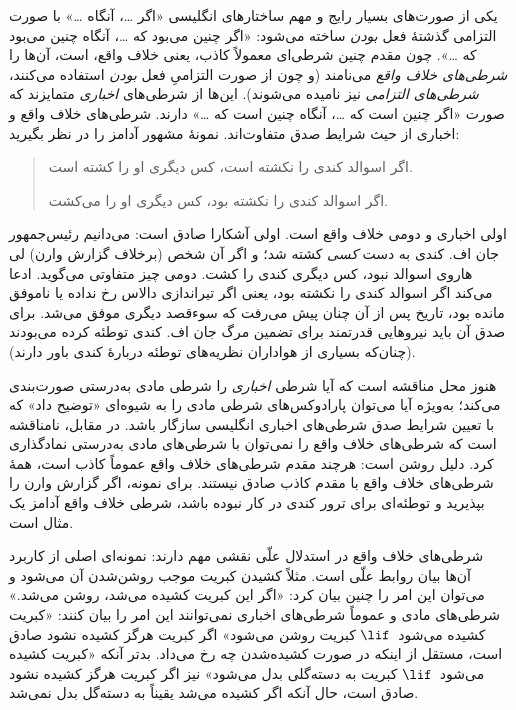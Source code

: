 \documentclass[../../../include/open-logic-section]{subfiles}
\begin{document}


یکی از صورت‌های بسیار رایج و مهم ساختارهای انگلیسی «اگر \dots، آنگاه
\dots» با صورت التزامی گذشتهٔ فعل \emph{بودن} ساخته می‌شود: «اگر چنین
می‌بود که \dots، آنگاه چنین می‌بود که \dots». چون مقدم چنین شرطی‌ای
معمولاً کاذب، یعنی خلاف واقع، است، آن‌ها را \emph{شرطی‌های خلاف واقع}
می‌نامند (و چون از صورت التزامیِ فعل \emph{بودن} استفاده می‌کنند،
\emph{شرطی‌های التزامی} نیز نامیده می‌شوند). این‌ها از شرطی‌های
\emph{اخباری} متمایزند که صورت «اگر چنین است که \dots، آنگاه چنین است
که \dots» دارند. شرطی‌های خلاف واقع و اخباری از حیث شرایط صدق متفاوت‌اند.
نمونهٔ مشهور آدامز را در نظر بگیرید:
\begin{quote}
  اگر اسوالد کندی را نکشته است، کس دیگری او را کشته است.
  
  اگر اسوالد کندی را نکشته بود، کس دیگری او را می‌کشت.
\end{quote}
اولی اخباری و دومی خلاف واقع است. اولی آشکارا صادق است: می‌دانیم
رئیس‌جمهور جان اف. کندی به دست \emph{کسی} کشته شد؛ و اگر آن شخص
(برخلاف گزارش وارن) لی هاروی اسوالد نبود، کس دیگری کندی را کشت. دومی
چیز متفاوتی می‌گوید. ادعا می‌کند اگر اسوالد کندی را نکشته بود، یعنی اگر
تیراندازی دالاس رخ نداده یا ناموفق مانده بود، تاریخ پس از آن چنان پیش
می‌رفت که سوءقصد دیگری موفق می‌شد. برای صدق آن باید نیروهایی قدرتمند
برای تضمین مرگ جان اف. کندی توطئه کرده می‌بودند (چنان‌که بسیاری از
هواداران نظریه‌های توطئه دربارهٔ کندی باور دارند).

هنوز محل مناقشه است که آیا شرطی \emph{اخباری} را شرطی مادی به‌درستی
صورت‌بندی می‌کند؛ به‌ویژه آیا می‌توان پارادوکس‌های شرطی مادی را به
شیوه‌ای «توضیح داد» که با تعیین شرایط صدق شرطی‌های اخباری انگلیسی
سازگار باشد. در مقابل، نامناقشه است که شرطی‌های خلاف واقع را نمی‌توان
با شرطی‌های مادی به‌درستی نمادگذاری کرد. دلیل روشن است: هرچند مقدم
شرطی‌های خلاف واقع عموماً کاذب است، همهٔ شرطی‌های خلاف واقع با مقدم
کاذب صادق نیستند. برای نمونه، اگر گزارش وارن را بپذیرید و توطئه‌ای برای
ترور کندی در کار نبوده باشد، شرطی خلاف واقع آدامز یک مثال است.

شرطی‌های خلاف واقع در استدلال علّی نقشی مهم دارند: نمونه‌ای اصلی از
کاربرد آن‌ها بیان روابط علّی است. مثلاً کشیدن کبریت موجب روشن‌شدن آن
می‌شود و می‌توان این امر را چنین بیان کرد: «اگر این کبریت کشیده می‌شد،
روشن می‌شد.» شرطی‌های مادی و عموماً شرطی‌های اخباری نمی‌توانند این امر
را بیان کنند: «کبریت کشیده می‌شود~$\lif$ کبریت روشن می‌شود» اگر کبریت
هرگز کشیده نشود صادق است، مستقل از اینکه در صورت کشیده‌شدن چه رخ
می‌داد. بدتر آنکه «کبریت کشیده می‌شود~$\lif$ کبریت به دسته‌گلی بدل
می‌شود» نیز اگر کبریت هرگز کشیده نشود صادق است، حال آنکه اگر کشیده
می‌شد یقیناً به دسته‌گل بدل نمی‌شد.
\end{document}
